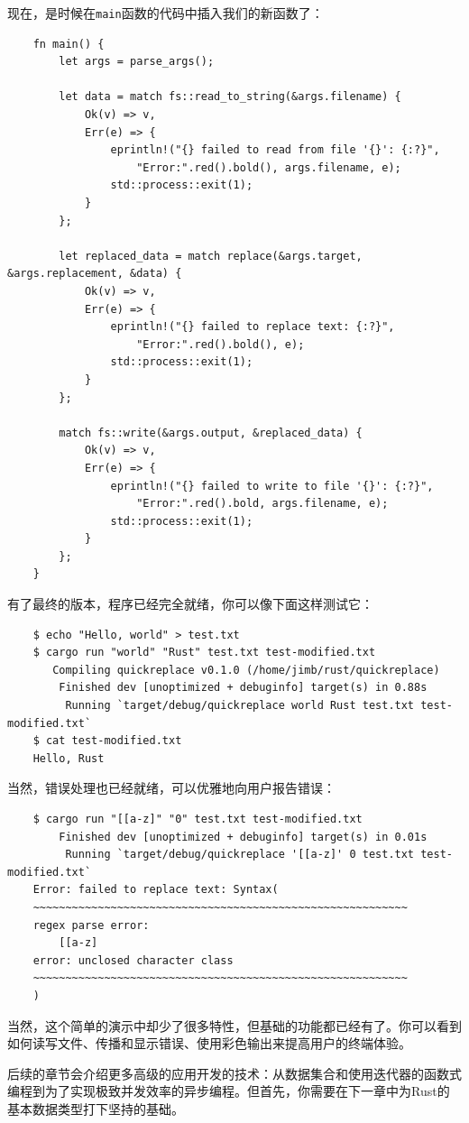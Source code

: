 现在，是时候在\texttt{main}函数的代码中插入我们的新函数了：
\begin{verbatim}
    fn main() {
        let args = parse_args();

        let data = match fs::read_to_string(&args.filename) {
            Ok(v) => v,
            Err(e) => {
                eprintln!("{} failed to read from file '{}': {:?}",
                    "Error:".red().bold(), args.filename, e);
                std::process::exit(1);
            }
        };

        let replaced_data = match replace(&args.target, &args.replacement, &data) {
            Ok(v) => v,
            Err(e) => {
                eprintln!("{} failed to replace text: {:?}",
                    "Error:".red().bold(), e);
                std::process::exit(1);
            }
        };

        match fs::write(&args.output, &replaced_data) {
            Ok(v) => v,
            Err(e) => {
                eprintln!("{} failed to write to file '{}': {:?}",
                    "Error:".red().bold, args.filename, e);
                std::process::exit(1);
            }
        };
    }
\end{verbatim}

有了最终的版本，程序已经完全就绪，你可以像下面这样测试它：
\begin{verbatim}
    $ echo "Hello, world" > test.txt
    $ cargo run "world" "Rust" test.txt test-modified.txt
       Compiling quickreplace v0.1.0 (/home/jimb/rust/quickreplace)
        Finished dev [unoptimized + debuginfo] target(s) in 0.88s
         Running `target/debug/quickreplace world Rust test.txt test-modified.txt`
    $ cat test-modified.txt
    Hello, Rust
\end{verbatim}

当然，错误处理也已经就绪，可以优雅地向用户报告错误：
\begin{verbatim}
    $ cargo run "[[a-z]" "0" test.txt test-modified.txt
        Finished dev [unoptimized + debuginfo] target(s) in 0.01s 
         Running `target/debug/quickreplace '[[a-z]' 0 test.txt test-modified.txt`
    Error: failed to replace text: Syntax(
    ~~~~~~~~~~~~~~~~~~~~~~~~~~~~~~~~~~~~~~~~~~~~~~~~~~~~~~~~~~
    regex parse error:
        [[a-z]
    error: unclosed character class
    ~~~~~~~~~~~~~~~~~~~~~~~~~~~~~~~~~~~~~~~~~~~~~~~~~~~~~~~~~~
    )
\end{verbatim}

当然，这个简单的演示中却少了很多特性，但基础的功能都已经有了。你可以看到如何读写文件、传播和显示错误、使用彩色输出来提高用户的终端体验。

后续的章节会介绍更多高级的应用开发的技术：从数据集合和使用迭代器的函数式编程到为了实现极致并发效率的异步编程。但首先，你需要在下一章中为Rust的基本数据类型打下坚持的基础。
